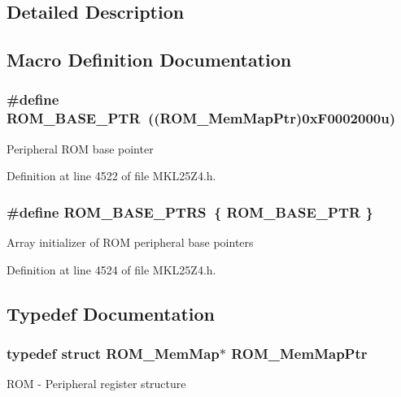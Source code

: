 \subsection{Detailed Description}


\subsection{Macro Definition Documentation}
\subsubsection[{\texorpdfstring{R\+O\+M\+\_\+\+B\+A\+S\+E\+\_\+\+P\+TR}{ROM_BASE_PTR}}]{\setlength{\rightskip}{0pt plus 5cm}\#define R\+O\+M\+\_\+\+B\+A\+S\+E\+\_\+\+P\+TR~(({\bf R\+O\+M\+\_\+\+Mem\+Map\+Ptr})0x\+F0002000u)}\hypertarget{group___r_o_m___peripheral_ga5ad426d10b6832ca7012e8767113f686}{}\label{group___r_o_m___peripheral_ga5ad426d10b6832ca7012e8767113f686}
Peripheral R\+OM base pointer 

Definition at line 4522 of file M\+K\+L25\+Z4.\+h.

\subsubsection[{\texorpdfstring{R\+O\+M\+\_\+\+B\+A\+S\+E\+\_\+\+P\+T\+RS}{ROM_BASE_PTRS}}]{\setlength{\rightskip}{0pt plus 5cm}\#define R\+O\+M\+\_\+\+B\+A\+S\+E\+\_\+\+P\+T\+RS~\{ {\bf R\+O\+M\+\_\+\+B\+A\+S\+E\+\_\+\+P\+TR} \}}\hypertarget{group___r_o_m___peripheral_ga41e000a3e59f16dd8f395cebcb883e82}{}\label{group___r_o_m___peripheral_ga41e000a3e59f16dd8f395cebcb883e82}
Array initializer of R\+OM peripheral base pointers 

Definition at line 4524 of file M\+K\+L25\+Z4.\+h.



\subsection{Typedef Documentation}
\subsubsection[{\texorpdfstring{R\+O\+M\+\_\+\+Mem\+Map\+Ptr}{ROM_MemMapPtr}}]{\setlength{\rightskip}{0pt plus 5cm}typedef struct {\bf R\+O\+M\+\_\+\+Mem\+Map}$\ast$ {\bf R\+O\+M\+\_\+\+Mem\+Map\+Ptr}}\hypertarget{group___r_o_m___peripheral_ga443285c54b394d010d2dccd28607e4b4}{}\label{group___r_o_m___peripheral_ga443285c54b394d010d2dccd28607e4b4}
R\+OM -\/ Peripheral register structure 